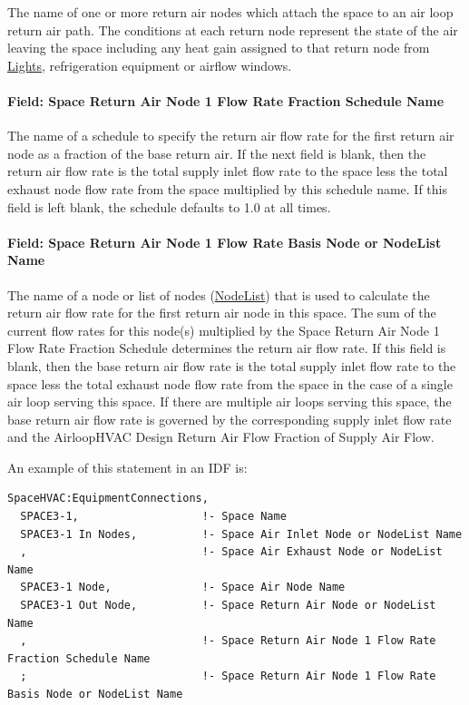 The name of one or more return air nodes which attach the space to an air loop return air path. The conditions at each return node represent the state of the air leaving the space including any heat gain assigned to that return node from \hyperref[lights-000]{Lights}, refrigeration equipment or airflow windows.

\paragraph{Field: Space Return Air Node 1 Flow Rate Fraction Schedule Name}\label{field-space-return-air-flow-rate-fraction-schedule-name}

The name of a schedule to specify the return air flow rate for the first return air node as a fraction of the base return air. If the next field is blank, then the return air flow rate is the total supply inlet flow rate to the space less the total exhaust node flow rate from the space multiplied by this schedule name. If this field is left blank, the schedule defaults to 1.0 at all times.

\paragraph{Field: Space Return Air Node 1 Flow Rate Basis Node or NodeList Name}\label{field-space-return-air-flow-rate-basis-node-or-nodelist-name}

The name of a node or list of nodes (\hyperref[nodelist]{NodeList}) that is used to calculate the return air flow rate for the first return air node in this space. The sum of the current flow rates for this node(s) multiplied by the Space Return Air Node 1 Flow Rate Fraction Schedule determines the return air flow rate. If this field is blank, then the base return air flow rate is the total supply inlet flow rate to the space less the total exhaust node flow rate from the space in the case of a single air loop serving this space. If there are multiple air loops serving this space, the base return air flow rate is governed by the corresponding supply inlet flow rate and the AirloopHVAC Design Return Air Flow Fraction of Supply Air Flow.

An example of this statement in an IDF is:

\begin{lstlisting}
SpaceHVAC:EquipmentConnections,
  SPACE3-1,                   !- Space Name
  SPACE3-1 In Nodes,          !- Space Air Inlet Node or NodeList Name
  ,                           !- Space Air Exhaust Node or NodeList Name
  SPACE3-1 Node,              !- Space Air Node Name
  SPACE3-1 Out Node,          !- Space Return Air Node or NodeList Name
  ,                           !- Space Return Air Node 1 Flow Rate Fraction Schedule Name
  ;                           !- Space Return Air Node 1 Flow Rate Basis Node or NodeList Name
\end{lstlisting}


